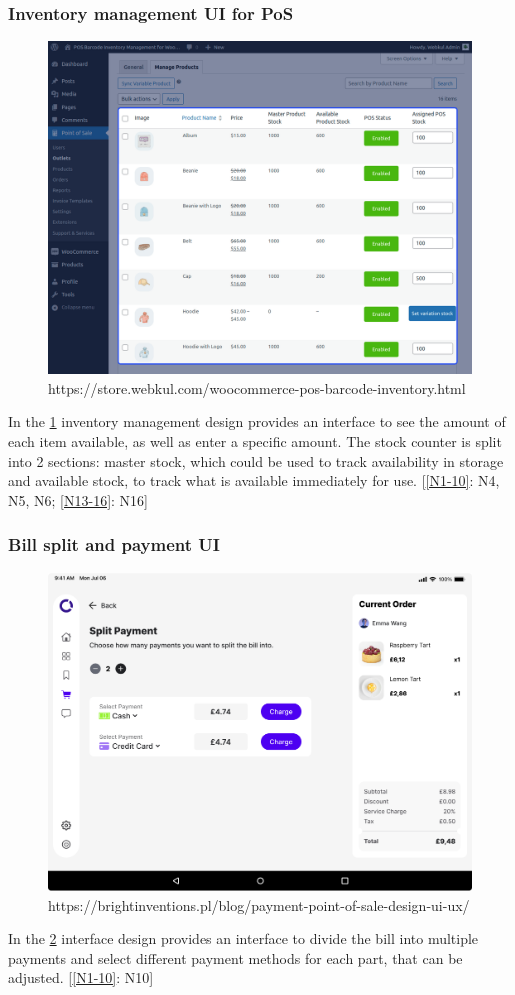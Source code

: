 \documentclass{article}
\begin{document}
\subsubsection{Inventory management UI for PoS}
\begin{figure}[H]
    \centering
    \includegraphics[width=0.9\linewidth]{HCI/images/inventory_management_UI.png}
    \caption{https://store.webkul.com/woocommerce-pos-barcode-inventory.html}
    \label{fig:Inv_management}
\end{figure}
\noindent
In the \cref{fig:Inv_management} inventory management design provides an interface to see the amount of each item available, as well as enter a specific amount. The stock counter is split into 2 sections: master stock, which could be used to track availability in storage and available stock, to track what is available immediately for use. [\cref{N1-10}: N4, N5, N6; \cref{N13-16}: N16]
\subsubsection{Bill split and payment UI}
\begin{figure}[H]
    \centering
    \includegraphics[width=0.9\linewidth]{HCI/images/split_payment.png}
    \caption{https://brightinventions.pl/blog/payment-point-of-sale-design-ui-ux/}
    \label{fig:Split_payment}
\end{figure}
\noindent
In the \cref{fig:Split_payment} interface design provides an interface to divide the bill into multiple payments and select different payment methods for each part, that can be adjusted. [\cref{N1-10}: N10]
\end{document}
